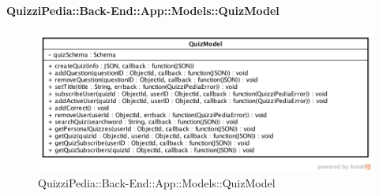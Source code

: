 \paragraph{QuizziPedia::Back-End::App::Models::QuizModel}
\label{QuizziPedia::Back-End::App::Models::QuizModel}
\begin{figure}[ht]
	\centering
	\includegraphics[scale=0.65]{UML/Classi/Back-End/QuizziPedia_Back-End_App_Models_quizModel.png}
	\caption{QuizziPedia::Back-End::App::Models::QuizModel}
\end{figure}
\FloatBarrier



